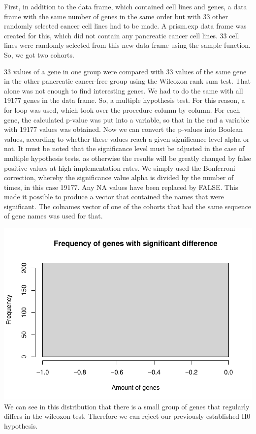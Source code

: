 \documentclass[
]{article}
\begin{document}
First, in addition to the data frame, which contained cell lines and
genes, a data frame with the same number of genes in the same order but
with 33 other randomly selected cancer cell lines had to be made. A
prism.exp data frame was created for this, which did not contain any
pancreatic cancer cell lines. 33 cell lines were randomly selected from
this new data frame using the sample function. So, we got two cohorts.

33 values of a gene in one group were compared with 33 values of the
same gene in the other pancreatic cancer-free group using the Wilcoxon
rank sum test. That alone was not enough to find interesting genes. We
had to do the same with all 19177 genes in the data frame. So, a
multiple hypothesis test. For this reason, a for loop was used, which
took over the procedure column by column. For each gene, the calculated
p-value was put into a variable, so that in the end a variable with
19177 values was obtained. Now we can convert the p-values into Boolean
values, according to whether these values reach a given significance
level alpha or not. It must be noted that the significance level must be
adjusted in the case of multiple hypothesis tests, as otherwise the
results will be greatly changed by false positive values at high
implementation rates. We simply used the Bonferroni correction, whereby
the significance value alpha is divided by the number of times, in this
case 19177. Any NA values have been replaced by FALSE. This made it
possible to produce a vector that contained the names that were
significant. The colnames vector of one of the cohorts that had the same
sequence of gene names was used for that.

\includegraphics{Drug-sensitivity-in-cancer-cell-lines_files/figure-latex/unnamed-chunk-4-1.pdf}
We can see in this distribution that there is a small group of genes
that regularly differs in the wilcoxon test. Therefore we can reject our
previously established H0 hypothesis.
\end{document}
